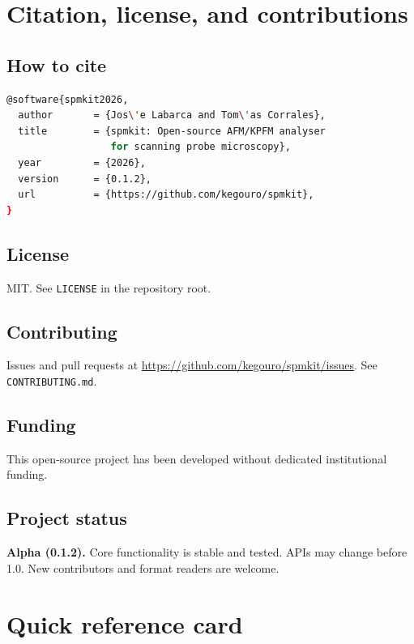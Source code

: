\documentclass[a4paper,11pt]{article}
\begin{document}
\section{Citation, license, and contributions}

\subsection{How to cite}

\begin{lstlisting}[language=bash]
@software{spmkit2026,
  author       = {Jos\'e Labarca and Tom\'as Corrales},
  title        = {spmkit: Open-source AFM/KPFM analyser
                  for scanning probe microscopy},
  year         = {2026},
  version      = {0.1.2},
  url          = {https://github.com/kegouro/spmkit},
}
\end{lstlisting}

\subsection{License}
MIT. See \texttt{LICENSE} in the repository root.

\subsection{Contributing}
Issues and pull requests at \url{https://github.com/kegouro/spmkit/issues}.
See \texttt{CONTRIBUTING.md}.

\subsection{Funding}
This open-source project has been developed without dedicated institutional funding.

\subsection{Project status}
\textbf{Alpha (0.1.2).} Core functionality is stable and tested. APIs may change before
1.0. New contributors and format readers are welcome.

\appendix

\section{Quick reference card}
\end{document}
